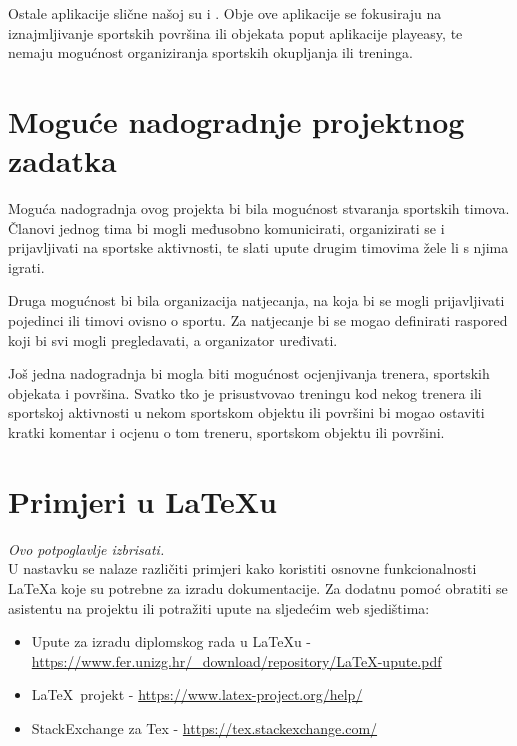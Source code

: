		Ostale aplikacije slične našoj su  i . Obje ove aplikacije se fokusiraju na iznajmljivanje sportskih površina ili objekata poput aplikacije playeasy, te nemaju mogućnost organiziranja sportskih okupljanja ili treninga.
		
		\section{Moguće nadogradnje projektnog zadatka}
		
		
		Moguća nadogradnja ovog projekta bi bila mogućnost stvaranja sportskih timova. Članovi jednog tima bi mogli međusobno komunicirati, organizirati se i prijavljivati na sportske aktivnosti, te slati upute drugim timovima žele li s njima igrati.
		
		Druga mogućnost bi bila organizacija natjecanja, na koja bi se mogli prijavljivati pojedinci ili timovi ovisno o sportu. Za natjecanje bi se mogao definirati raspored koji bi svi mogli pregledavati, a organizator uređivati.
		
		Još jedna nadogradnja bi mogla biti mogućnost ocjenjivanja trenera, sportskih objekata i površina. Svatko tko je prisustvovao treningu kod nekog trenera ili sportskoj aktivnosti u nekom sportskom objektu ili površini bi mogao ostaviti kratki komentar i ocjenu o tom treneru, sportskom objektu ili površini. 

\iffalse	%
	
		\section{Primjeri u \LaTeX u}
		
		\textit{Ovo potpoglavlje izbrisati.}\\

		U nastavku se nalaze različiti primjeri kako koristiti osnovne funkcionalnosti \LaTeX a koje su potrebne za izradu dokumentacije. Za dodatnu pomoć obratiti se asistentu na projektu ili potražiti upute na sljedećim web sjedištima:
		\begin{itemize}
			\item Upute za izradu diplomskog rada u \LaTeX u - \url{https://www.fer.unizg.hr/_download/repository/LaTeX-upute.pdf}
			\item \LaTeX\ projekt - \url{https://www.latex-project.org/help/}
			\item StackExchange za Tex - \url{https://tex.stackexchange.com/}\\
		
		\end{itemize} 	


